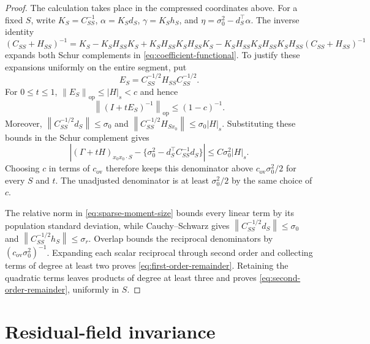 \documentclass[a4paper,11pt,english]{article}
\newcommand{\norm}[1]{\left\lVert #1\right\rVert}
\begin{document}
\begin{proof}
The calculation takes place in the compressed coordinates above.  For a
fixed $S$, write
$K_S=C_{SS}^{-1}$, $\alpha=K_Sd_S$, $\gamma=K_Sh_S$, and
$\eta=\sigma_0^2-d_S^\top\alpha$.  The inverse identity
\[
        (C_{SS}+H_{SS})^{-1}
        =K_S-K_SH_{SS}K_S+K_SH_{SS}K_SH_{SS}K_S
        -K_SH_{SS}K_SH_{SS}K_SH_{SS}(C_{SS}+H_{SS})^{-1}
\]
expands both Schur complements in
\eqref{eq:coefficient-functional}.  To justify these expansions uniformly
on the entire segment, put
\[
 E_S=C_{SS}^{-1/2}H_{SS}C_{SS}^{-1/2}.
\]
For $0\le t\le1$, $\norm{E_S}_{\mathrm{op}}\le |H|_s<c$ and hence
\[
 \norm{(I+tE_S)^{-1}}_{\mathrm{op}}
 \le(1-c)^{-1}.
\]
Moreover, $\norm{C_{SS}^{-1/2}d_S}\le\sigma_0$ and
$\norm{C_{SS}^{-1/2}H_{Sx_0}}\le\sigma_0|H|_s$.  Substituting these bounds
in the Schur complement gives
\[
 \left|(\Gamma+tH)_{x_0x_0\mathbin{\cdot}S}
 -\{\sigma_0^2-d_S^\top C_{SS}^{-1}d_S\}\right|
 \le C\sigma_0^2|H|_s.
\]
Choosing $c$ in terms of $c_{\mathrm{ov}}$ therefore keeps this denominator
above $c_{\mathrm{ov}}\sigma_0^2/2$ for every $S$ and $t$.  The unadjusted
denominator is at least $\sigma_0^2/2$ by the same choice of $c$.

The relative norm in \eqref{eq:sparse-moment-size} bounds every linear
term by its population standard deviation, while Cauchy--Schwarz gives
$\norm{C_{SS}^{-1/2}d_S}\le\sigma_0$ and
$\norm{C_{SS}^{-1/2}h_S}\le\sigma_r$.  Overlap bounds the reciprocal
denominators by $(c_{\mathrm{ov}}\sigma_0^2)^{-1}$.  Expanding each scalar
reciprocal through second order and collecting terms of degree at least
two proves \eqref{eq:first-order-remainder}.  Retaining the quadratic
terms leaves products of degree at least three and proves
\eqref{eq:second-order-remainder}, uniformly in $S$.
\end{proof}

\section{Residual-field invariance}
\end{document}
